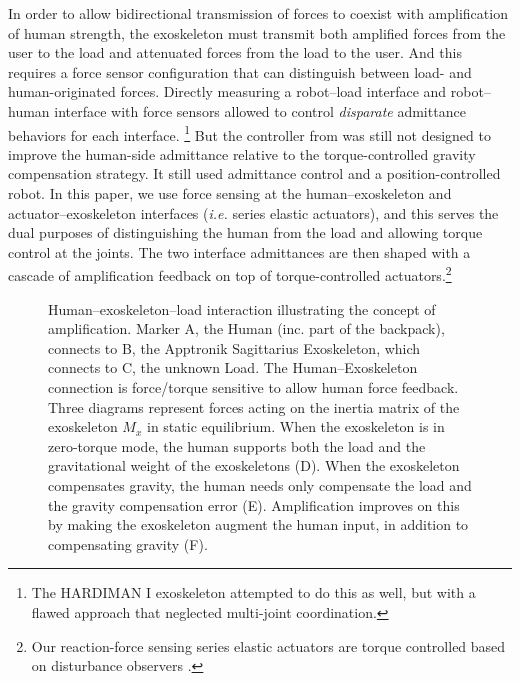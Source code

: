 \documentclass[utf8]{frontiersSCNS}
\renewcommand*{\cite}[1]{\citep{#1}}
\begin{document}
In order to allow bidirectional transmission of forces to coexist with amplification of human strength, the exoskeleton must transmit both amplified forces from the user to the load and attenuated forces from the load to the user.
And this requires a force sensor configuration that can distinguish between load- and human-originated forces.
Directly measuring a robot--load interface and robot--human interface with force sensors allowed \cite{KazerooniGuo1993JDSMC,KazerooniMahoney1991ICRA,KazerooniMahoney1991JDSMC} to control \emph{disparate} admittance behaviors for each interface.%
\footnote{The HARDIMAN I exoskeleton \cite{MakinsonBodineFitck1969Techreport} attempted to do this as well, but with a flawed approach that neglected multi-joint coordination.}
But the controller from \cite{KazerooniGuo1993JDSMC} was still not designed to improve the human-side admittance relative to the torque-controlled gravity compensation strategy. It still used admittance control and a position-controlled robot.
In this paper, we use force sensing at the human--exoskeleton and actuator--exoskeleton interfaces (\emph{i.e.} series elastic actuators), and this serves the dual purposes of distinguishing the human from the load and allowing torque control at the joints.
The two interface admittances are then shaped with a cascade of amplification feedback on top of torque-controlled actuators.\footnote{Our reaction-force sensing series elastic actuators are torque controlled based on disturbance observers \cite{PaineOhSentis2014TMech,Paine2014Dissertation}.}

\begin{figure}\centering
	\def\svgwidth{.8\columnwidth}
	
	\caption{Human--exoskeleton--load interaction illustrating the concept of amplification. Marker A, the Human (inc. part of the backpack), connects to B, the Apptronik Sagittarius Exoskeleton, which connects to C, the unknown Load. The Human--Exoskeleton connection is force/torque sensitive to allow human force feedback. Three diagrams represent forces acting on the inertia matrix of the exoskeleton $M_x$ in static equilibrium. When the exoskeleton is in zero-torque mode, the human supports both the load and the gravitational weight of the exoskeletons (D). When the exoskeleton compensates gravity, the human needs only compensate the load and the gravity compensation error (E). Amplification improves on this by making the exoskeleton augment the human input, in addition to compensating gravity (F).
	}\label{fig:newfirst}
\end{figure}
\end{document}
